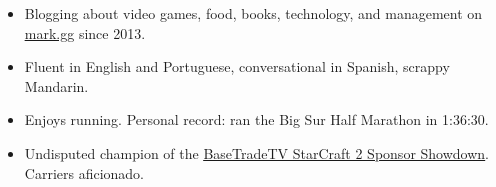 

\begin{cvparagraph}


\begin{justify}
\begin{itemize}[leftmargin=2ex, nosep]
    \setlength{\parskip}{0pt}
    \setlength\itemsep{0.15em}
    \renewcommand{\labelitemi}{\bullet}
    
    \item Blogging about video games, food, books, technology, and management on \href{mark.gg}{\underline{mark.gg}} since 2013.
    \item Fluent in English and Portuguese, conversational in Spanish, scrappy Mandarin.
	\item Enjoys running. Personal record: ran the Big Sur Half Marathon in 1:36:30.
	\item Undisputed champion of the \href{http://www.teamliquid.net/forum/sc2-tournaments/529105-basetradetv-sponsor-showdown}{\underline {BaseTradeTV StarCraft 2 Sponsor Showdown}}. Carriers aficionado.


\end{itemize}
\end{justify}

\end{cvparagraph}

